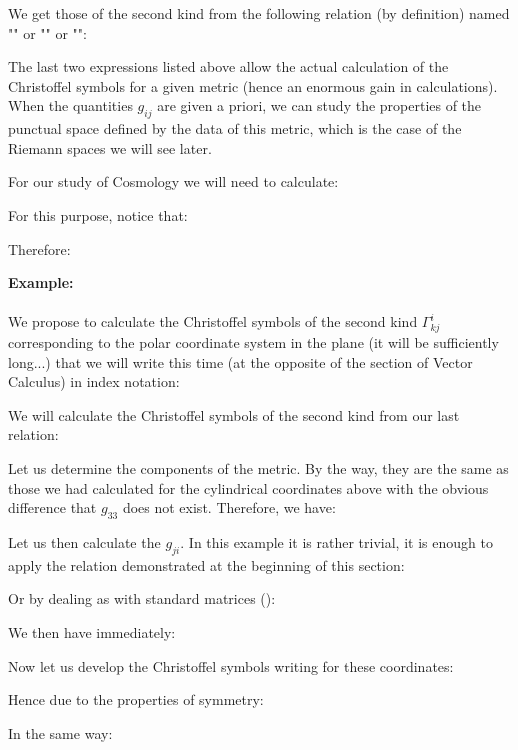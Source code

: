	We get those of the second kind from the following relation (by definition) named "\label{fundamental theorem of Riemannian geometry}" or "" or "":
	
	The last two expressions listed above allow the actual calculation of the Christoffel symbols for a given metric (hence an enormous gain in calculations). When the quantities $g_{ij}$ are given a priori, we can study the properties of the punctual space defined by the data of this metric, which is the case of the Riemann spaces we will see later.
	
	For our study of Cosmology we will need to calculate:
	
	For this purpose, notice that:
	
	Therefore:
	

	\pagebreak
	\begin{tcolorbox}[colframe=black,colback=white,sharp corners]
	\textbf{{\Large {}}Example:}\\\\
	We propose to calculate the Christoffel symbols of the second kind $\Gamma_{kj}^i$ corresponding to the polar coordinate system in the plane  (it will be sufficiently long...) that we will write this time (at the opposite of the section of Vector Calculus) in index notation:
	
	We will calculate the Christoffel symbols of the second kind from our last relation:
	
	Let us determine the components of the metric. By the way, they are the same as those we had calculated for the cylindrical coordinates above with the obvious difference that $g_{33}$ does not exist. Therefore, we have:
	
	Let us then calculate the $g_{ji}$. In this example it is rather trivial, it is enough to apply the relation demonstrated at the beginning of this section:
	
	Or by dealing as with standard matrices ():
	
	We then have immediately:
	
	Now let us develop the Christoffel symbols writing for these coordinates:
	\end{tcolorbox}
	
	
	\begin{tcolorbox}[colframe=black,colback=white,sharp corners]
	
	Hence due to the properties of symmetry:
	
	In the same way:
	
	\end{tcolorbox}
	
